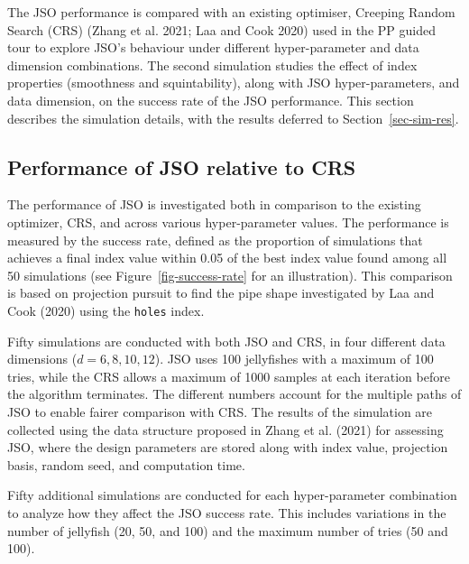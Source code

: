 \documentclass[
  12pt,
]{interact}
\theoremstyle{plain}
\begin{document}
The JSO performance is compared with an existing optimiser, Creeping
Random Search (CRS) (Zhang et al. 2021; Laa and Cook 2020) used in the
PP guided tour to explore JSO's behaviour under different
hyper-parameter and data dimension combinations. The second simulation
studies the effect of index properties (smoothness and squintability),
along with JSO hyper-parameters, and data dimension, on the success rate
of the JSO performance. This section describes the simulation details,
with the results deferred to Section~\ref{sec-sim-res}.

\subsection{Performance of JSO relative to CRS}\label{sec-app-1}

The performance of JSO is investigated both in comparison to the
existing optimizer, CRS, and across various hyper-parameter values. The
performance is measured by the success rate, defined as the proportion
of simulations that achieves a final index value within 0.05 of the best
index value found among all 50 simulations (see
Figure~\ref{fig-success-rate} for an illustration). This comparison is
based on projection pursuit to find the pipe shape investigated by Laa
and Cook (2020) using the \texttt{holes} index.

Fifty simulations are conducted with both JSO and CRS, in four different
data dimensions (\(d = 6, 8, 10, 12\)). JSO uses 100 jellyfishes with a
maximum of 100 tries, while the CRS allows a maximum of 1000 samples at
each iteration before the algorithm terminates. The different numbers
account for the multiple paths of JSO to enable fairer comparison with
CRS. The results of the simulation are collected using the data
structure proposed in Zhang et al. (2021) for assessing JSO, where the
design parameters are stored along with index value, projection basis,
random seed, and computation time.

Fifty additional simulations are conducted for each hyper-parameter
combination to analyze how they affect the JSO success rate. This
includes variations in the number of jellyfish (20, 50, and 100) and the
maximum number of tries (50 and 100).
\end{document}
